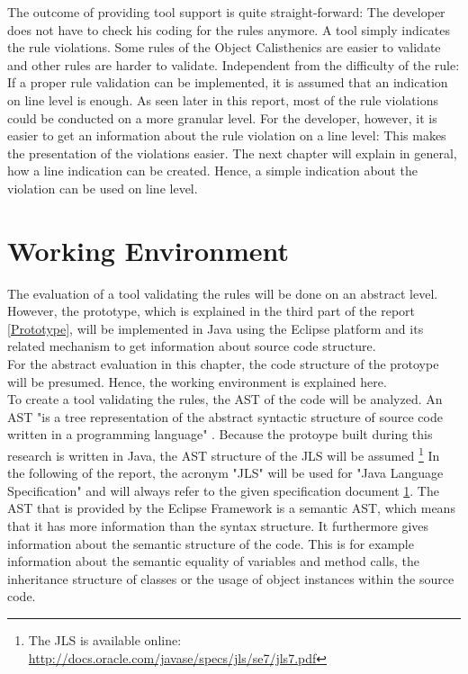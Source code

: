 The outcome of providing tool support is quite straight-forward: The developer does not have to check his coding for the rules anymore. A tool simply indicates the rule violations. Some rules of the Object Calisthenics are easier to validate and other rules are harder to validate. Independent from the difficulty of the rule: If a proper rule validation can be implemented, it is assumed that an indication on line level is enough. As seen later in this report, most of the rule violations could be conducted on a more granular level. For the developer, however, it is easier to get an information about the rule violation on a line level: This makes the presentation of the violations easier. The next chapter will explain in general, how a line indication can be created. Hence, a simple indication about the violation can be used on line level. 

\section{Working Environment}
The evaluation of a tool validating the rules will be done on an abstract level. However, the prototype, which is explained in the third part of the report \ref{Prototype}, will be implemented in Java using the Eclipse platform and its related mechanism to get information about source code structure. 
\\
For the abstract evaluation in this chapter, the code structure of the protoype will be presumed. Hence, the working environment is explained here. 
\\

To create a tool validating the rules, the \ac{AST} of the code will be analyzed. An \ac{AST} "is a tree representation of the abstract syntactic structure of source code written in a programming language" \cite[Abstract Syntax Tree]{wiki}. Because the protoype built during this research is written in Java, the \ac{AST} structure of the \ac{JLS} will be assumed \footnote{\label{foot:jls}The \ac{JLS} is available online: \url{http://docs.oracle.com/javase/specs/jls/se7/jls7.pdf}} In the following of the report, the acronym "JLS" will be used for "Java Language Specification" and will always refer to the given specification document \ref{foot:jls}. The \ac{AST} that is provided by the Eclipse Framework is a semantic \ac{AST}, which means that it has more information than the syntax structure. It furthermore gives information about the semantic structure of the code. This is for example information about the semantic equality of variables and method calls, the inheritance structure of classes or the usage of object instances within the source code.
\\

